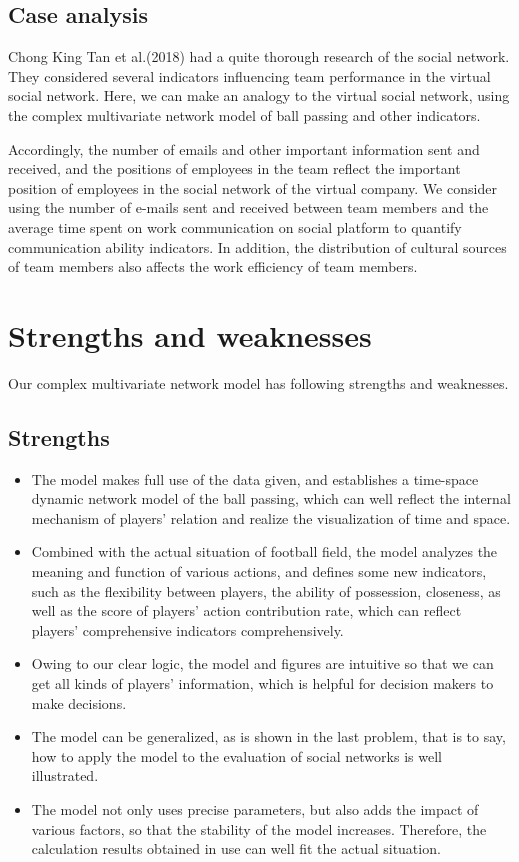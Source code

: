 \documentclass{mcmthesis}
\begin{document}
{\subsection{Case analysis}
\indent Chong King Tan et al.(2018) had a quite thorough research of the social network. They considered several indicators influencing team performance in the virtual social network. Here, we can make an analogy to the virtual social network, using the complex multivariate network model of ball passing and other indicators.

\indent Accordingly, the number of emails and other important information sent and received, and the positions of employees in the team reflect the important position of employees in the social network of the virtual company. We consider using the number of e-mails sent and received between team members and the average time spent on work communication on social platform to quantify communication ability indicators. In addition, the distribution of cultural sources of team members also affects the work efficiency of team members.


\section{Strengths and weaknesses}
Our complex multivariate network model has following strengths and weaknesses.
\subsection{Strengths}
\begin{itemize}
\item The model makes full use of the data given, and establishes a time-space dynamic network model of the ball passing, which can well reflect the internal mechanism of players' relation and realize the visualization of time and space.
\item Combined with the actual situation of football field, the model analyzes the meaning and function of various actions, and defines some new indicators, such as the flexibility between players, the ability of possession, closeness, as well as the score of players' action contribution rate, which can reflect players' comprehensive indicators comprehensively.
\item Owing to our clear logic, the model and figures are intuitive so that we can get all kinds of players' information, which is helpful for decision makers to make decisions.
\item The model can be generalized, as is shown in the last problem, that is to say, how to apply the model to the evaluation of social networks is well illustrated.
\item The model not only uses precise parameters, but also adds the impact of various factors, so that the stability of the model increases. Therefore, the calculation results obtained in use can well fit the actual situation.
\end{itemize}




}
\end{document}
